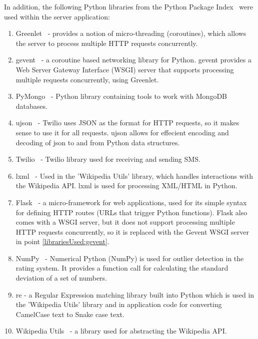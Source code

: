 \documentclass[authoryearcitations]{UoYCSproject}
\begin{document}
In addition, the following Python libraries from the Python Package Index~\cite{pypi} were used within the server application:
\begin{enumerate}
    \item Greenlet~\cite{libraryGreenlet} - provides a notion of micro-threading (coroutines), which allows the server to process multiple HTTP requests concurrently.
    \item gevent~\cite{libraryGevent} \label{librariesUsed:gevent} - a coroutine based networking library for Python. gevent provides a Web Server Gateway Interface (WSGI) server that supports processing multiple requests concurrently, using Greenlet.
    \item PyMongo~\cite{libraryPyMongo} - Python library containing tools to work with MongoDB databases.
    \item ujson~\cite{libraryUjson} - Twilio uses JSON as the format for HTTP requests, so it makes sense to use it for all requests. ujson allows for effecient encoding and decoding of json to and from Python data structures.
    \item Twilio~\cite{libraryTwilio2} - Twilio library used for receiving and sending SMS.
    \item lxml~\cite{libraryLxml} - Used in the 'Wikipedia Utils' library, which handles interactions with the Wikipedia API. lxml is used for processing XML/HTML in Python.
    \item Flask~\cite{libraryFlask} - a micro-framework for web applications, used for its simple syntax for defining HTTP routes (URLs that trigger Python functions). Flask also comes with a WSGI server, but it does not support processing multiple HTTP requests concurrently, so it is replaced with the Gevent WSGI server in point \ref{librariesUsed:gevent}.
    \item NumPy~\cite{libraryNumPy} - Numerical Python (NumPy) is used for outlier detection in the rating system. It provides a function call for calculating the standard deviation of a set of numbers.
    \item re - a Regular Expression matching library built into Python which is used in the 'Wikipedia Utils' library and in application code for converting CamelCase text to Snake case text.
    \item Wikipedia Utils~\cite{libraryWikipediaUtils} - a library used for abstracting the Wikipedia API.
\end{enumerate}
\end{document}
